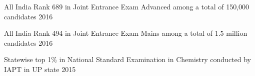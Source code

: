 



\begin{cvhonors}



  \cvhonor
  {All India Rank 689} %
  {in Joint Entrance Exam Advanced among a total of 150,000 candidates} %
  {} %
  {2016} %
  
  \cvhonor
  {All India Rank 494} %
  {in Joint Entrance Exam Mains among a total of 1.5 million candidates} %
  {} %
  {2016} %

  \cvhonor
  {Statewise top 1\%}
  {in National Standard Examination in Chemistry conducted by IAPT in UP state}
  {}
  {2015}


\end{cvhonors}

